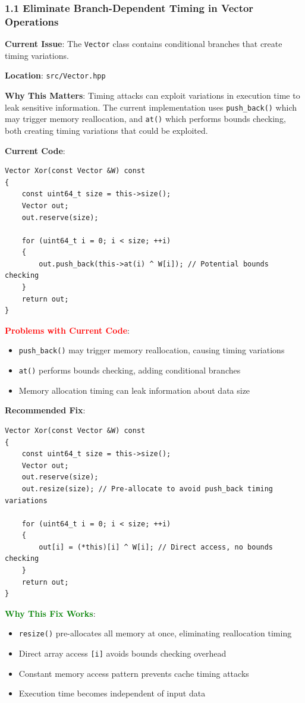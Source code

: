 \documentclass[11pt,a4paper]{article}
\begin{document}
\subsubsection{1.1 Eliminate Branch-Dependent Timing in Vector Operations}

\textbf{Current Issue}: The \texttt{Vector} class contains conditional branches that create timing variations.

\textbf{Location}: \texttt{src/Vector.hpp}

\textbf{Why This Matters}: Timing attacks can exploit variations in execution time to leak sensitive information. The current implementation uses \texttt{push\_back()} which may trigger memory reallocation, and \texttt{at()} which performs bounds checking, both creating timing variations that could be exploited.

\textbf{Current Code}:
\begin{lstlisting}
Vector Xor(const Vector &W) const
{
    const uint64_t size = this->size();
    Vector out;
    out.reserve(size);

    for (uint64_t i = 0; i < size; ++i)
    {
        out.push_back(this->at(i) ^ W[i]); // Potential bounds checking
    }
    return out;
}
\end{lstlisting}

\textcolor{red}{\textbf{Problems with Current Code}}:
\begin{itemize}
    \item \texttt{push\_back()} may trigger memory reallocation, causing timing variations
    \item \texttt{at()} performs bounds checking, adding conditional branches
    \item Memory allocation timing can leak information about data size
\end{itemize}

\textbf{Recommended Fix}:
\begin{lstlisting}
Vector Xor(const Vector &W) const
{
    const uint64_t size = this->size();
    Vector out;
    out.reserve(size);
    out.resize(size); // Pre-allocate to avoid push_back timing variations

    for (uint64_t i = 0; i < size; ++i)
    {
        out[i] = (*this)[i] ^ W[i]; // Direct access, no bounds checking
    }
    return out;
}
\end{lstlisting}

\textcolor{green}{\textbf{Why This Fix Works}}:
\begin{itemize}
    \item \texttt{resize()} pre-allocates all memory at once, eliminating reallocation timing
    \item Direct array access \texttt{[i]} avoids bounds checking overhead
    \item Constant memory access pattern prevents cache timing attacks
    \item Execution time becomes independent of input data
\end{itemize}
\end{document}
